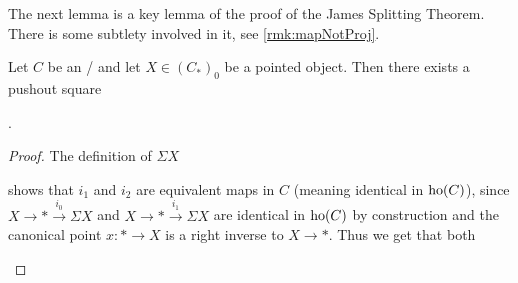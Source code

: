 The next lemma is a key lemma of the proof of the James Splitting Theorem.
There is some subtlety involved in it, see \cref{rmk:mapNotProj}.
\begin{lemma}\label{lem:existenceOfPoSq} %
    Let $C$ be an \inftytop/ and let $X\in \left(C_*\right)_0$ be a pointed object.
    Then there exists a pushout square  
    \begin{center}
        \;.
    \end{center}
    \begin{proof}
        The definition of $\Sigma X$
        \begin{center}
        \end{center}
        shows that $i_1$ and $i_2$ are equivalent maps in $C$ (meaning identical in $\operatorname{ho}(C)$), since $X\to *\xrightarrow{i_0}\Sigma X$ and $X\to *\xrightarrow{i_1}\Sigma X$ are identical in $\operatorname{ho}(C)$ by construction and the canonical point $x\colon*\to X$ is a right inverse to $X\to *$.
        Thus we get that both
        \begin{center}
        \end{center}

\end{proof}
\end{lemma}
